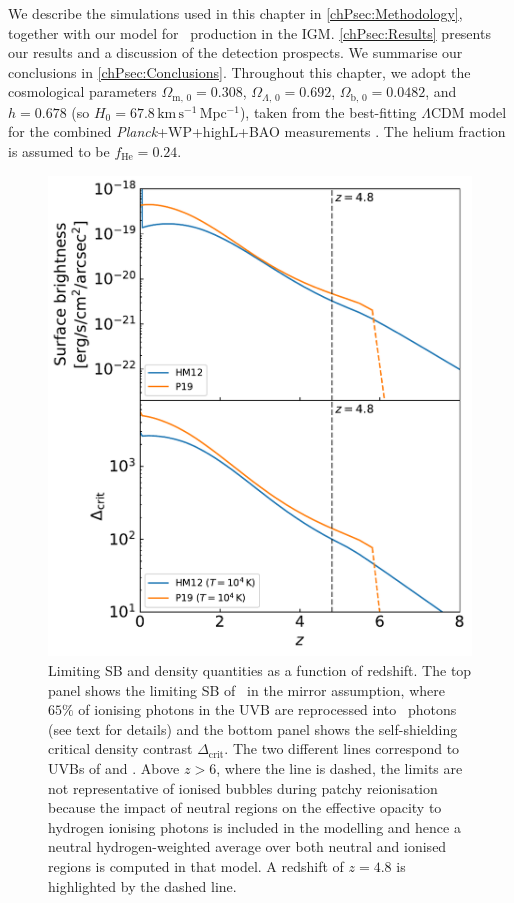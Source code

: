 We describe the simulations used in this chapter in \cref{chPsec:Methodology}, together with our model for \lya\ production in the IGM. \cref{chPsec:Results} presents our results and a discussion of the detection prospects. We summarise our conclusions in \cref{chPsec:Conclusions}. Throughout this chapter, we adopt the cosmological parameters $\Omega_{\text{m}, \, 0} = 0.308$, $\Omega_{\Lambda, \, 0} = 0.692$, $\Omega_{\text{b}, \, 0} = 0.0482$, and $h=0.678$ (so $H_0 = 67.8 \, \mathrm{km \, s^{-1} \, Mpc^{-1}}$), taken from the best-fitting $\Lambda$CDM model for the combined \textit{Planck}+WP+highL+BAO measurements \citep{2014A&A...571A..16P}. The helium fraction is assumed to be $f_\text{He} = 0.24$.
\begin{figure}
    \centering
    \includegraphics[width=0.6\linewidth]{"Plots/ChapterP/UVB_limits"}
    \caption[Limiting SB and density quantities as a function of redshift]
    {Limiting SB and density quantities as a function of redshift. The top panel shows the limiting SB of \lya\ in the mirror assumption, where $65\%$ of ionising photons in the UVB are reprocessed into \lya\ photons (see text for details) and the bottom panel shows the self-shielding critical density contrast $\Delta_\text{crit}$. The two different lines correspond to UVBs of \citet[, ]{2012ApJ...746..125H} and \citet[, ]{2019MNRAS.485...47P}. Above $z>6$, where the line is dashed, the  limits are not representative of ionised bubbles during patchy reionisation because the impact of neutral regions on the effective opacity to hydrogen ionising photons is included in the modelling  and hence a neutral hydrogen-weighted average over both neutral and ionised regions is computed in that model. A redshift of $z=4.8$ is highlighted by the dashed line.}
    \label{chPfig:UVB_limits}
\end{figure}

